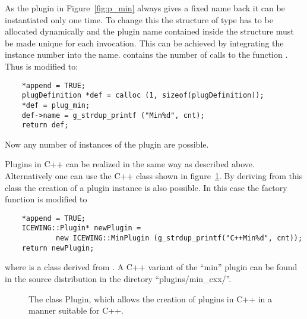 As the plugin in Figure~\ref{fig:p_min} always gives a fixed name
back it can be instantiated only one time. To change this the
structure of type  has to be allocated
dynamically and the plugin name contained inside the structure must
be made unique for each invocation. This can be achieved by
integrating the instance number  into the name. 
contains the number of calls to the function
. Thus  is modified
to:
\begin{small}
\linespread{0.9}
\begin{verbatim}
    *append = TRUE;
    plugDefinition *def = calloc (1, sizeof(plugDefinition));
    *def = plug_min;
    def->name = g_strdup_printf ("Min%d", cnt);
    return def;
\end{verbatim}
\end{small}
Now any number of instances of the plugin are possible.

Plugins in C++ can be realized in the same way as described above.
Alternatively one can use the C++ class shown in
figure~\ref{fig:p_cpp}. By deriving from this class the creation of
a plugin instance is also possible. In this case the factory
function  is modified to
\begin{small}
\linespread{0.9}
\begin{verbatim}
    *append = TRUE;
    ICEWING::Plugin* newPlugin =
            new ICEWING::MinPlugin (g_strdup_printf("C++Min%d", cnt));
    return newPlugin;
\end{verbatim}
\end{small}
where  is a class derived from
. A C++ variant of the ``min'' plugin can
be found in the \icewing{} source distribution in the diretory
``plugins/min\_cxx/''.

\begin{figure}[htb]
  \begin{center}
    \begin{small}
    \end{small}
  \end{center}
  \caption[The class Plugin]
  {The class Plugin, which allows the creation of plugins in C++ in
    a manner suitable for C++.}
  \label{fig:p_cpp}
\end{figure}

